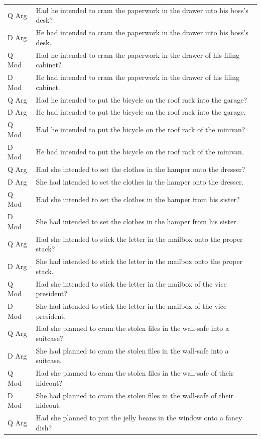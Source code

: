 \documentclass[11pt,oneside]{book}
\begin{document}
\begin{longtable}{ll}
Q Arg & Had he intended to cram the paperwork in the drawer into his boss's desk?\\
D Arg & He had intended to cram the paperwork in the drawer into his boss's desk.\\
Q Mod & Had he intended to cram the paperwork in the drawer of his filing cabinet?\\
D Mod & He had intended to cram the paperwork in the drawer of his filing cabinet.\\
\addlinespace
Q Arg & Had he intended to put the bicycle on the roof rack into the garage?\\
D Arg & He had intended to put the bicycle on the roof rack into the garage.\\
Q Mod & Had he intended to put the bicycle on the roof rack of the minivan?\\
D Mod & He had intended to put the bicycle on the roof rack of the minivan.\\
\addlinespace
Q Arg & Had she intended to set the clothes in the hamper onto the dresser?\\
D Arg & She had intended to set the clothes in the hamper onto the dresser.\\
Q Mod & Had she intended to set the clothes in the hamper from his sister?\\
D Mod & She had intended to set the clothes in the hamper from his sister.\\
\addlinespace
Q Arg & Had she intended to stick the letter in the mailbox onto the proper stack?\\
D Arg & She had intended to stick the letter in the mailbox onto the proper stack.\\
Q Mod & Had she intended to stick the letter in the mailbox of the vice president?\\
D Mod & She had intended to stick the letter in the mailbox of the vice president.\\
\addlinespace
Q Arg & Had she planned to cram the stolen files in the wall-safe into a suitcase?\\
D Arg & She had planned to cram the stolen files in the wall-safe into a suitcase.\\
Q Mod & Had she planned to cram the stolen files in the wall-safe of their hideout?\\
D Mod & She had planned to cram the stolen files in the wall-safe of their hideout.\\
\addlinespace
Q Arg & Had she planned to put the jelly beans in the window onto a fancy dish?\\

\end{longtable}
\end{document}
